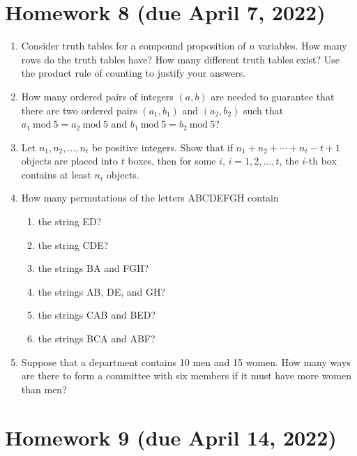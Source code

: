 \documentclass[11pt]{article}
\newcommand{\Mod}[1]{\ \mathrm{mod}\ #1}\usepackage{parskip} %
\begin{document}
\section*{Homework 8 (due April 7, 2022)}

\begin{enumerate}
    \item Consider truth tables for a compound proposition of $n$ variables. How many rows do the truth tables have? How many different truth tables exist? Use the product rule of counting to justify your answers.
    \item How many ordered pairs of integers $(a,b)$ are needed to guarantee that there are two ordered pairs $(a_1, b_1)$ and $(a_2, b_2)$ such that $a_1 \Mod{5} = a_2 \Mod{5}$ and $b_1 \Mod{5} = b_2 \Mod{5}$?
    \item Let $n_1, n_2, \ldots, n_t$ be positive integers. Show that if $n_1 + n_2 + \cdots + n_t - t + 1$ objects are placed into $t$ boxes, then for some $i$, $i = 1, 2, \ldots, t$, the $i$-th box contains at least $n_i$ objects.
    \item How many permutations of the letters ABCDEFGH contain
    \begin{enumerate}
        \item the string ED?
        \item the string CDE?
        \item the strings BA and FGH?
        \item the strings AB, DE, and GH?
        \item the strings CAB and BED?
        \item the strings BCA and ABF?
    \end{enumerate}
    \item Suppose that a department contains 10 men and 15 women. How many ways are there to form a committee with six members if it must have more women than men?
\end{enumerate}

\section*{Homework 9 (due April 14, 2022)}
\end{document}

